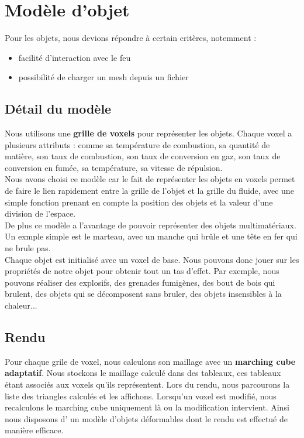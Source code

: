 \documentclass[a4paper,10pt]{article}
\begin{document}
\newpage
\section{Modèle d'objet}

Pour les objets, nous devions répondre à certain critères, notemment :
\begin{itemize}
\item facilité d'interaction avec le feu
\item possibilité de charger un mesh depuis un fichier
\end{itemize}

\subsection{Détail du modèle}
Nous utilisons une \textbf{grille de voxels} pour représenter les
objets. Chaque voxel a plusieurs attributs : comme sa température de
combustion, sa quantité de matière, son taux de combustion, son taux
de conversion en gaz, son taux de conversion en fumée, sa température,
sa vitesse de répulsion.\\

Nous avons choisi ce modèle car le fait de représenter les objets en
voxels permet de faire le lien rapidement entre la grille de l'objet
et la grille du fluide, avec une simple fonction prenant en compte la
position des objets et la valeur d'une division de l'espace.\\ 

De plus ce modèle a l'avantage de pouvoir représenter des objets
multimatériaux. Un exmple simple est le marteau, avec un manche qui
brûle et une tête en fer qui ne brule pas.\\

Chaque objet est initialisé avec un voxel de base. Nous pouvons donc
jouer sur les propriétés de notre objet pour obtenir tout un tas
d'effet. Par exemple, nous pouvons réaliser des explosifs, des
grenades fumigènes, des bout de bois qui brulent, des objets qui se
décomposent sans bruler, des objets insensibles à la chaleur...

\subsection{Rendu}
Pour chaque grile de voxel, nous calculons son maillage avec un
\textbf{marching cube adaptatif}.  Nous stockons le maillage calculé
dans des tableaux, ces tableaux étant associés aux voxels qu'ils
représentent. Lors du rendu, nous parcourons la liste des triangles
calculés et les affichons. Lorsqu'un voxel est modifié, nous
recalculons le marching cube uniquement là ou la modification
intervient. Ainsi nous disposons d' un modèle d'objets déformables
dont le rendu est effectué de manière efficace.
\end{document}
